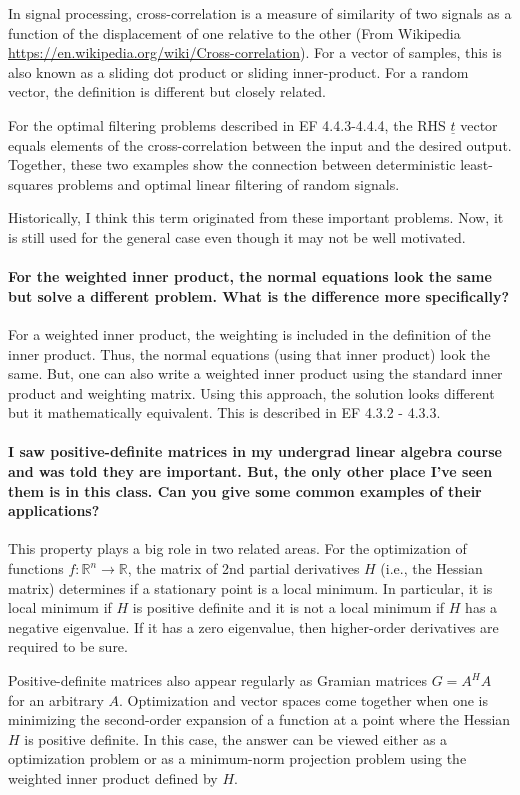 \documentclass[10pt,english]{article}
\begin{document}
In signal processing, cross-correlation is a measure of similarity of two signals as a function of the displacement of one relative to the other (From Wikipedia \url{https://en.wikipedia.org/wiki/Cross-correlation}). For a vector of samples, this is also known as a sliding dot product or sliding inner-product.  For a random vector, the definition is different but closely related.

For the optimal filtering problems described in EF 4.4.3-4.4.4, the RHS $\underline{t}$ vector equals elements of the cross-correlation between the input and the desired output.
Together, these two examples show the connection between deterministic least-squares problems and optimal linear filtering of random signals.

Historically, I think this term originated from these important problems.
Now, it is still used for the general case even though it may not be well motivated.


\paragraph{For the weighted inner product, the normal equations look the same but solve a different problem. What is the difference more specifically?}
For a weighted inner product, the weighting is included in the definition of the inner product.
Thus, the normal equations (using that inner product) look the same.
But, one can also write a weighted inner product using the standard inner product and weighting matrix.
Using this approach, the solution looks different but it mathematically equivalent.
This is described in EF 4.3.2 - 4.3.3.


\paragraph{I saw positive-definite matrices in my undergrad linear algebra course and was told they are important. But, the only other place I've seen them is in this class. Can you give some common examples of their applications?}

This property plays a big role in two related areas.
For the optimization of functions $f \colon \mathbb{R}^n \to \mathbb{R}$, the matrix of 2nd partial derivatives $H$ (i.e., the Hessian matrix) determines if a stationary point is a local minimum.
In particular, it is local minimum if $H$ is positive definite and it is not a local minimum if $H$ has a negative eigenvalue.
If it has a zero eigenvalue, then higher-order derivatives are required to be sure.

Positive-definite matrices also appear regularly as Gramian matrices $G = A^H A$ for an arbitrary $A$.
Optimization and vector spaces come together when one is minimizing the second-order expansion of a function at a point where the Hessian $H$ is positive definite.
In this case, the answer can be viewed either as a optimization problem or as a minimum-norm projection problem using the weighted inner product defined by $H$.
\end{document}
